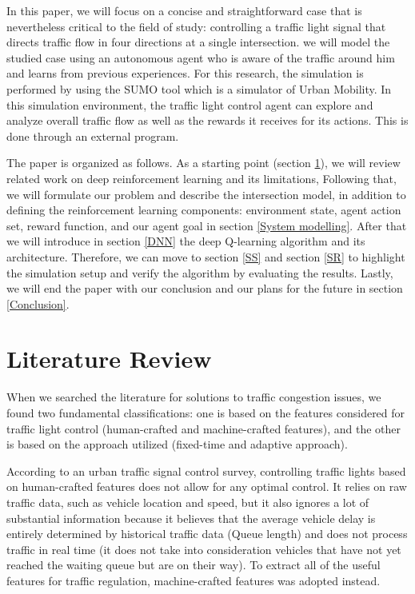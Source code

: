 \documentclass[conference]{IEEEtran}
\begin{document}
In this paper, we will focus on a concise and straightforward case that is nevertheless critical to the field of study: controlling a traffic light signal that directs traffic flow in four directions at a single intersection. we will model the studied case using an autonomous agent who is aware of the traffic around him and learns from previous experiences. For this research, the simulation is performed by using the SUMO tool which is a simulator of Urban Mobility\cite{sumo}. In this simulation environment, the traffic light control agent can explore and analyze overall traffic flow as well as the rewards it receives for its actions. This is done through an external program. 

The paper is organized as follows. As a starting point (section \ref{LR}), we will review related work on deep reinforcement learning and its limitations, Following that, we will formulate our problem and describe the intersection model, in addition to defining the reinforcement learning components: environment state, agent action set, reward function, and our agent goal in section \ref{System modelling}. After that we will introduce in section \ref{DNN} the deep Q-learning algorithm and its architecture. Therefore, we can move to section \ref{SS} and section \ref{SR} to highlight the simulation setup and verify the algorithm by evaluating the results. Lastly, we will end the paper with our conclusion and our plans for the future in section \ref{Conclusion}.

\section{Literature Review}\label{LR}
When we searched the literature for solutions to traffic congestion issues, we found two fundamental classifications: one is based on the features considered for traffic light control (human-crafted and machine-crafted features), and the other is based on the approach utilized (fixed-time and adaptive approach).

According to an urban traffic signal control survey\cite{survey}, controlling traffic lights based on human-crafted features does not allow for any optimal control. It relies on raw traffic data, such as vehicle location and speed, but it also ignores a lot of substantial information because it believes that the average vehicle delay is entirely determined by historical traffic data (Queue length) and does not process traffic in real time (it does not take into consideration vehicles that have not yet reached the waiting queue but are on their way). To extract all of the useful features for traffic regulation, machine-crafted features was adopted instead. 
\end{document}
